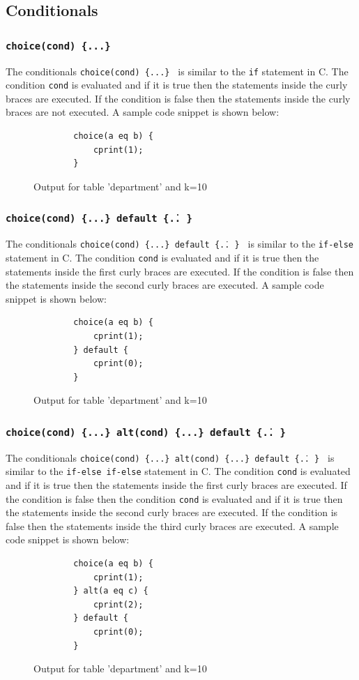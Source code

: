 \documentclass[12pt]{article}
\begin{document}
\subsection{Conditionals}
\subsubsection{\texttt{choice(cond) \{...\} }}
The conditionals \texttt{choice(cond) \{...\} } is similar to the \texttt{if} statement in C. The condition \texttt{cond} is evaluated and if it is true then the statements inside the curly braces are executed. If the condition is false then the statements inside the curly braces are not executed.
A sample code snippet is shown below:
\begin{figure}[H]
    \label{choice}
    \centering
    \begin{BVerbatim}
        choice(a eq b) {
            cprint(1);
        }
    \end{BVerbatim}
    \caption{Output for table 'department' and k=10}
    \end{figure}
\subsubsection{\texttt{choice(cond) \{...\} default \{\... \} }}
The conditionals \texttt{choice(cond) \{...\} default \{\... \} } is similar to the \texttt{if-else} statement in C. The condition \texttt{cond} is evaluated and if it is true then the statements inside the first curly braces are executed. If the condition is false then the statements inside the second curly braces are executed.
A sample code snippet is shown below:
\begin{figure}[H]
    \label{choice}
    \centering
    \begin{BVerbatim}
        choice(a eq b) {
            cprint(1);
        } default {
            cprint(0);
        }
    \end{BVerbatim}
    \caption{Output for table 'department' and k=10}
    \end{figure}
\subsubsection{\texttt{choice(cond) \{...\} alt(cond) \{...\} default \{\... \} }}
The conditionals \texttt{choice(cond) \{...\} alt(cond) \{...\} default \{\... \} } is similar to the \texttt{if-else if-else} statement in C. The condition \texttt{cond} is evaluated and if it is true then the statements inside the first curly braces are executed. If the condition is false then the condition \texttt{cond} is evaluated and if it is true then the statements inside the second curly braces are executed. If the condition is false then the statements inside the third curly braces are executed.
A sample code snippet is shown below:
\begin{figure}[H]
    \label{choice}
    \centering
    \begin{BVerbatim}
        choice(a eq b) {
            cprint(1);
        } alt(a eq c) {
            cprint(2);
        } default {
            cprint(0);
        }
    \end{BVerbatim}
    \caption{Output for table 'department' and k=10}
    \end{figure}
\end{document}

